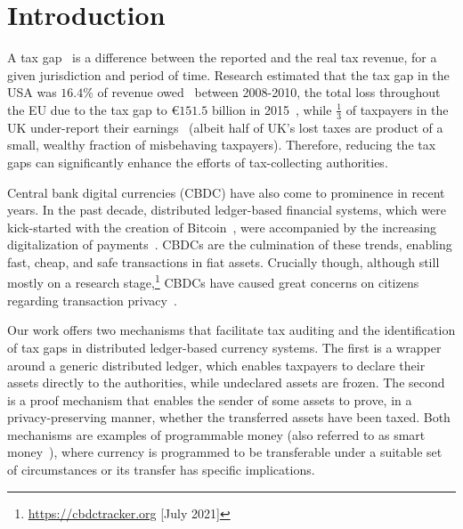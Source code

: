 \section{Introduction}\label{sec:introduction}

A tax gap~\cite{comission2018taxgaps} is a difference between the reported and
the real tax revenue, for a given jurisdiction and period of time. Research
estimated that the tax gap in the USA was $16.4$\% of revenue
owed~\cite{internal2016federal} between 2008-2010, the total loss throughout
the EU due to the tax gap to €$151.5$ billion in 2015~\cite{murphy2018resources}, while
$\frac{1}{3}$ of taxpayers in the UK under-report their
earnings~\cite{advani2020does} (albeit half of UK's lost taxes are product of a
small, wealthy fraction of misbehaving taxpayers). Therefore, reducing the tax
gaps can significantly enhance the efforts of tax-collecting authorities.

Central bank digital currencies (CBDC) have also come to prominence in recent
years. In the past decade, distributed ledger-based financial systems, which
were kick-started with the creation of Bitcoin~\cite{nakamoto2008bitcoin}, were
accompanied by the increasing digitalization of payments~\cite{bis2011digital}.
CBDCs are the culmination of these trends, enabling fast, cheap, and safe
transactions in fiat assets. Crucially though, although still mostly on a
research stage,\footnote{\url{https://cbdctracker.org} [July 2021]} CBDCs have
caused great concerns on citizens regarding transaction
privacy~\cite{ecb2021cbdcprivacy}.

Our work offers two mechanisms that facilitate tax auditing and the
identification of tax gaps in distributed ledger-based currency systems. The
first is a wrapper around a generic distributed ledger, which enables taxpayers
to declare their assets directly to the authorities, while undeclared assets
are frozen. The second is a proof mechanism that enables the sender of some
assets to prove, in a privacy-preserving manner, whether the transferred assets
have been taxed. Both mechanisms are examples of programmable money (also referred to as smart money~\cite{AHA}),
where currency is programmed to be transferable under a suitable set of  circumstances or its transfer has specific implications.
